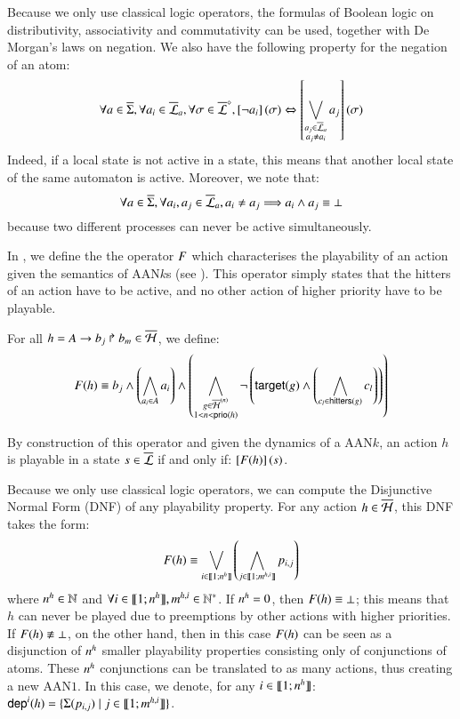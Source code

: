 Because we only use classical logic operators, the formulas of Boolean logic on 
distributivity, associativity and commutativity can be used, together with De Morgan's laws on negation.
We also have the following property for the negation of an atom:
\[\forall a \in \overline{\Sigma}, \forall a_i \in \overline{\mathcal{L}}_a, \forall \sigma \in \overline{\mathcal{L}}^{\diamond},
  \left[\neg a_i\right](\sigma) \Leftrightarrow \left[\bigvee_{\substack{a_j \in \overline{\mathcal{L}}_a\\a_j \neq a_i}} a_j\right](\sigma)\]
Indeed, if a local state is not active in a state, this means that another local state of the same automaton is active.
Moreover, we note that:
\[\forall a \in \overline{\Sigma}, \forall a_i, a_j \in \overline{\mathcal{L}}_a,
  a_i \neq a_j \Longrightarrow a_i \wedge a_j \equiv \bot \]
because two different processes can never be active simultaneously.

In , we define the the operator $F$ which characterises the playability of an action
given the semantics of AAN$k$s (see ).
This operator simply states that the hitters of an action have to be active,
and no other action of higher priority have to be playable.

\begin{definition}\label{def:fop}
  For all $h = A\rightarrow b_j\Rsh b_m \in \overline{\mathcal{H}}$, we define:
  \[
    F(h) \equiv
    b_j \wedge
    \left(\bigwedge_{a_i \in A} a_i\right)
    \wedge
      \left( \bigwedge_{\substack{g \in \overline{\mathcal{H}}^{(n)}\\1 < n < \mathsf{prio}(h)}}
      \neg \left( \mathsf{target}(g) \wedge \left(\bigwedge_{c_l \in \mathsf{hitters}(g)} c_l\right)\right) \right)
  \]
\end{definition}
%
By construction of this operator and given the dynamics of a AAN$k$,
an action $h$ is playable in a state $s \in \overline{\mathcal{L}}$ if and only if: $\left[F(h)\right](s)$.

Because we only use classical logic operators, we can compute the Disjunctive Normal Form (DNF) of any playability property.
For any action $h \in \overline{\mathcal{H}}$, this DNF takes the form:
\[F(h) \equiv \bigvee_{i \in \llbracket 1; n^{h} \rrbracket} \left( \bigwedge_{j \in \llbracket 1; m^{h,i} \rrbracket} p_{i,j} \right)\]
where $n^{h} \in \mathbb{N}$ and $\forall i \in \llbracket 1; n^{h} \rrbracket, m^{h,i} \in \mathbb{N}^*$.
If $n^{h} = 0$, then $F(h) \equiv \bot$; this means that $h$ can never be played
due to preemptions by other actions with higher priorities.
If $F(h) \not\equiv \bot$, on the other hand, then in this case $F(h)$
can be seen as a disjunction of $n^{h}$ smaller playability properties consisting only of conjunctions of atoms.
These $n^{h}$ conjunctions can be translated to as many actions,
thus creating a new AAN$1$.
In this case, we denote, for any $i \in \llbracket 1; n^{h} \rrbracket$:
$\mathsf{dep}^{i}(h) = \{ \Sigma(p_{i,j}) \mid j \in \llbracket 1; m^{h,i} \rrbracket \}$.

